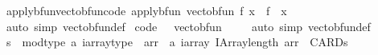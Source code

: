 \begin{isabellebody}
\isanewline
{}\isamarkupfalse%
\ apply{\isacharunderscore}{\kern0pt}bfun{\isacharunderscore}{\kern0pt}vec{\isacharunderscore}{\kern0pt}to{\isacharunderscore}{\kern0pt}bfun{\isacharbrackleft}{\kern0pt}code{\isacharbrackright}{\kern0pt}{\isacharcolon}{\kern0pt}\ {\isachardoublequoteopen}apply{\isacharunderscore}{\kern0pt}bfun\ {\isacharparenleft}{\kern0pt}vec{\isacharunderscore}{\kern0pt}to{\isacharunderscore}{\kern0pt}bfun\ f{\isacharparenright}{\kern0pt}\ x\ {\isacharequal}{\kern0pt}\ f\ {\isachardollar}{\kern0pt}\ x{\isachardoublequoteclose}\isanewline
%
\isadelimproof
\ \ %
\endisadelimproof
%
\isatagproof
{}\isamarkupfalse%
\ {\isacharparenleft}{\kern0pt}auto\ simp{\isacharcolon}{\kern0pt}\ vec{\isacharunderscore}{\kern0pt}to{\isacharunderscore}{\kern0pt}bfun{\isacharunderscore}{\kern0pt}def{\isacharparenright}{\kern0pt}%
\endisatagproof
{\isafoldproof}%
%
\isadelimproof
\isanewline
%
\endisadelimproof
\isanewline
{}\isamarkupfalse%
\ {\isacharbrackleft}{\kern0pt}code{\isacharbrackright}{\kern0pt}{\isacharcolon}{\kern0pt}\ {\isachardoublequoteopen}{}\ {\isacharequal}{\kern0pt}\ vec{\isacharunderscore}{\kern0pt}to{\isacharunderscore}{\kern0pt}bfun\ {}{\isachardoublequoteclose}\isanewline
%
\isadelimproof
\ \ %
\endisadelimproof
%
\isatagproof
{}\isamarkupfalse%
\ {\isacharparenleft}{\kern0pt}auto\ simp{\isacharcolon}{\kern0pt}\ vec{\isacharunderscore}{\kern0pt}to{\isacharunderscore}{\kern0pt}bfun{\isacharunderscore}{\kern0pt}def{\isacharparenright}{\kern0pt}%
\endisatagproof
{\isafoldproof}%
%
\isadelimproof
%
\endisadelimproof
%
\isadelimdocument
%
\endisadelimdocument
%
\isatagdocument
%
\isamarkuptrue%
%
\endisatagdocument
{\isafolddocument}%
%
\isadelimdocument
%
\endisadelimdocument
{}\isamarkupfalse%
\ {\isacharparenleft}{\kern0pt}{\isacharprime}{\kern0pt}s\ {\isacharcolon}{\kern0pt}{\isacharcolon}{\kern0pt}\ mod{\isacharunderscore}{\kern0pt}type{\isacharcomma}{\kern0pt}\ {\isacharprime}{\kern0pt}a{\isacharparenright}{\kern0pt}\ iarray{\isacharunderscore}{\kern0pt}type\ {\isacharequal}{\kern0pt}\ {\isachardoublequoteopen}{\isacharbraceleft}{\kern0pt}arr\ {\isacharcolon}{\kern0pt}{\isacharcolon}{\kern0pt}\ {\isacharprime}{\kern0pt}a\ iarray{\isachardot}{\kern0pt}\ IArray{\isachardot}{\kern0pt}length\ arr\ {\isacharequal}{\kern0pt}\ CARD{\isacharparenleft}{\kern0pt}{\isacharprime}{\kern0pt}s{\isacharparenright}{\kern0pt}{\isacharbraceright}{\kern0pt}{\isachardoublequoteclose}\isanewline
%
\isadelimproof

\end{isabellebody}

